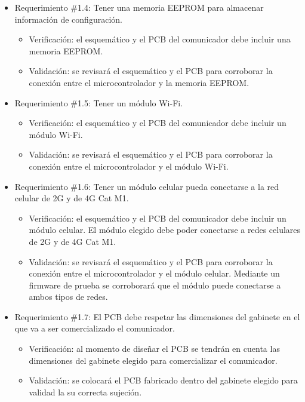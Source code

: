 \documentclass[
11pt, %
codirector, %
]{charter}
\begin{document}
\begin{itemize}
	\item Requerimiento \#1.4: Tener una memoria EEPROM para almacenar información de configuración.
	\begin{itemize}
		\item Verificación: el esquemático y el PCB del comunicador debe incluir una memoria EEPROM.
		\item Validación: se revisará el esquemático y el PCB para corroborar la conexión entre el microcontrolador y la memoria EEPROM.
	\end{itemize}
			
	\item Requerimiento \#1.5: Tener un módulo Wi-Fi. 
	\begin{itemize}
		\item Verificación: el esquemático y el PCB del comunicador debe incluir un módulo Wi-Fi.
		\item Validación: se revisará el esquemático y el PCB para corroborar la conexión entre el microcontrolador y el módulo Wi-Fi.
	\end{itemize}
			
	\item Requerimiento \#1.6: Tener un módulo celular pueda conectarse a la red celular de 2G y de 4G Cat M1.
	\begin{itemize}
		\item Verificación: el esquemático y el PCB del comunicador debe incluir un módulo celular. El módulo elegido debe poder conectarse a redes celulares de 2G y de 4G Cat M1.
		\item Validación: se revisará el esquemático y el PCB para corroborar la conexión entre el microcontrolador y el módulo celular. Mediante un firmware de prueba se corroborará que el módulo puede conectarse a ambos tipos de redes.
	\end{itemize}
			
	\item Requerimiento \#1.7: El PCB debe respetar las dimensiones del gabinete en el que va a ser comercializado el comunicador.
	\begin{itemize}
		\item Verificación: al momento de diseñar el PCB se tendrán en cuenta las dimensiones del gabinete elegido para comercializar el comunicador.
		\item Validación: se colocará el PCB fabricado dentro del gabinete elegido para validad la su correcta sujeción.
	\end{itemize}
			

\end{itemize}
\end{document}
